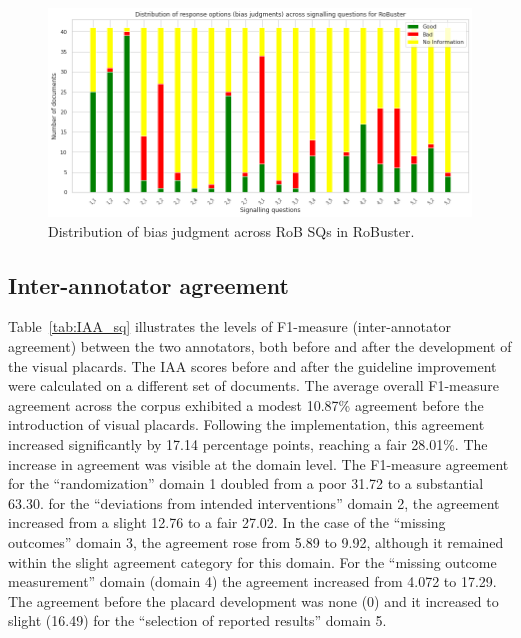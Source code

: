\documentclass[sn-mathphys,Numbered]{sn-jnl}%
\theoremstyle{thmstyleone}%
\theoremstyle{thmstyletwo}%
\theoremstyle{thmstylethree}%
\begin{document}
%
%
%
\begin{figure}[htb]
    \centering
    \includegraphics[width=0.90\columnwidth]{figures/bias_chart.png}
    \caption{Distribution of bias judgment across RoB SQs in RoBuster.}
    \label{fig:rob_information}
\end{figure}
%
%
%

%
%
%
\subsection{Inter-annotator agreement}
\label{result:iaa}
%
Table~\ref{tab:IAA_sq} illustrates the levels of F1-measure (inter-annotator agreement) between the two annotators, both before and after the development of the visual placards.
The IAA scores before and after the guideline improvement were calculated on a different set of documents.
The average overall F1-measure agreement across the corpus exhibited a modest 10.87\% agreement before the introduction of visual placards. Following the implementation, this agreement increased significantly by 17.14 percentage points, reaching a fair 28.01\%.
The increase in agreement was visible at the domain level.
The F1-measure agreement for the ``randomization'' domain 1 doubled from a poor 31.72 to a substantial 63.30.
for the ``deviations from intended interventions'' domain 2, the agreement increased from a slight 12.76 to a fair 27.02.
In the case of the ``missing outcomes'' domain 3, the agreement rose from 5.89 to 9.92, although it remained within the slight agreement category for this domain. 
For the ``missing outcome measurement'' domain (domain 4) the agreement increased from 4.072 to 17.29.
The agreement before the placard development was none (0) and it increased to slight (16.49) for the ``selection of reported results'' domain 5.
\end{document}
